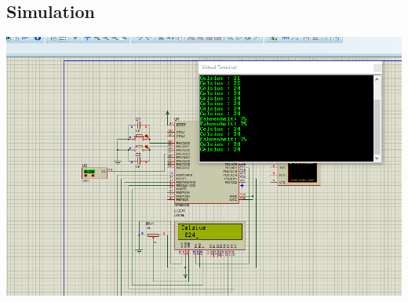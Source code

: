 \subsection{Simulation}
\centerline{
	\includegraphics[width=1.0\textwidth]{solution/images/result.png}
}

